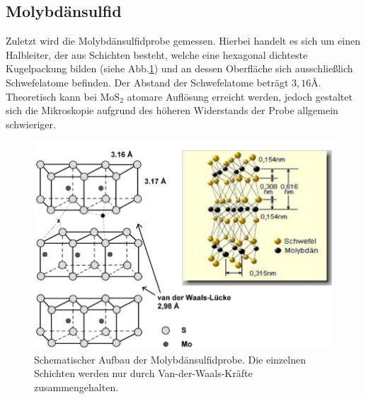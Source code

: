 \subsection{Molybdänsulfid}
Zuletzt wird die Molybdänsulfidprobe gemessen. Hierbei handelt es sich um einen Halbleiter, der aus Schichten besteht, welche eine hexagonal dichteste Kugelpackung bilden (siehe Abb.\ref{mos_struktur}) und an dessen Oberfläche sich ausschließlich Schwefelatome befinden. Der Abstand der Schwefelatome beträgt $3,16\si{\angstrom}$. Theoretisch kann bei $\text{MoS}_{2}$ atomare Auflösung erreicht werden, jedoch gestaltet sich die Mikroskopie aufgrund des höheren Widerstands der Probe allgemein schwieriger.
\cite{beschr}

\begin{figure}[h]
	\centering
	\includegraphics[width=\linewidth]{Mess/mos_struktur}
        \caption{Schematischer Aufbau der Molybdänsulfidprobe. Die einzelnen Schichten werden nur durch Van-der-Waals-Kräfte zusammengehalten. \cite{beschr}}
	\label{mos_struktur}
\end{figure}

